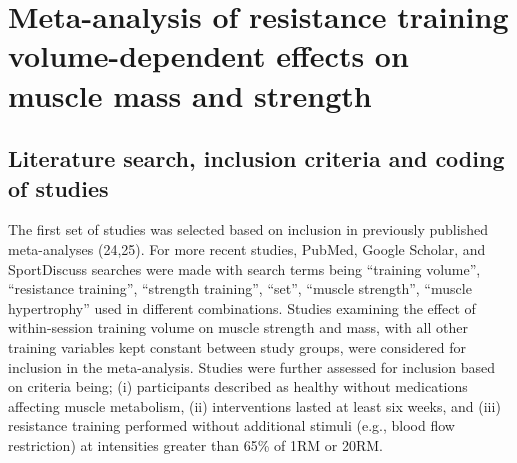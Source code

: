 \documentclass[twoside,10pt]{gihclass} %
\begin{document}
\hypertarget{meta-analysis-of-resistance-training-volume-dependent-effects-on-muscle-mass-and-strength}{%
\section{Meta-analysis of resistance training volume-dependent effects on muscle mass and strength}\label{meta-analysis-of-resistance-training-volume-dependent-effects-on-muscle-mass-and-strength}}

\hypertarget{literature-search-inclusion-criteria-and-coding-of-studies}{%
\subsection{Literature search, inclusion criteria and coding of studies}\label{literature-search-inclusion-criteria-and-coding-of-studies}}

The first set of studies was selected based on inclusion in previously published
meta-analyses (24,25). For more recent studies, PubMed, Google Scholar, and SportDiscuss searches were made with search terms being ``training volume'', ``resistance training'', ``strength training'', ``set'',
``muscle strength'', ``muscle hypertrophy'' used in different combinations. Studies examining the effect of within-session training volume on muscle strength and mass, with all other training variables kept constant between study groups, were considered for inclusion in the meta-analysis.
Studies were further assessed for inclusion based on criteria being; (i) participants described as healthy without medications affecting muscle
metabolism, (ii) interventions lasted at least six weeks, and (iii) resistance training performed without additional stimuli (e.g., blood flow restriction) at intensities greater than 65\% of 1RM or 20RM.
\end{document}
